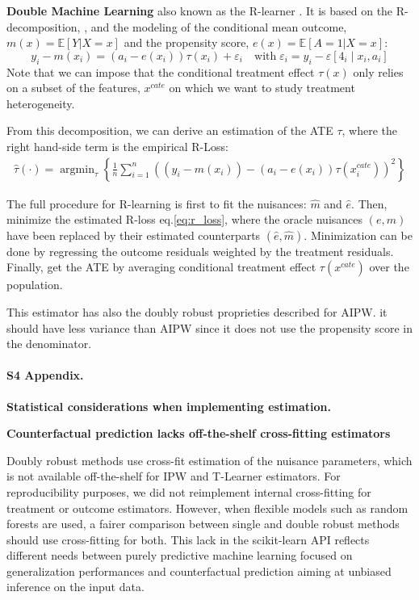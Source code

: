 \documentclass[10pt,letterpaper]{article}
\begin{document}
\textbf{Double Machine Learning} \cite{chernozhukov2018double} also known
as the R-learner \cite{nie2021quasi}. It is based on the R-decomposition,
\cite{robinson1988root}, and the modeling of the conditional mean outcome,
$m(x)=\mathbb E[Y|X=x]$ and the propensity score, $e(x)=\mathbb E[A=1|X=x]$:
\begin{equation}\label{eq:r_decomposition}
    y_{i}-m\left(x_{i}\right)=\left(a_{i}-e\left(x_{i}\right)\right) \tau\left(x_{i}\right)+\varepsilon_{i} \quad \text{with} \; \varepsilon_{i}=y_{i}-\varepsilon\left[4_{i} \mid x_{i}, a_{i}\right]
\end{equation}
Note that we can impose that the conditional treatment effect $\tau(x)$ only
relies on a subset of the features, $x^{cate}$ on which we want to study
treatment heterogeneity.

From this decomposition, we can derive an estimation of the ATE $\tau$, where
the right hand-side term is the empirical R-Loss:
\begin{align}\label{eq:r_loss}
    \hat{\tau}(\cdot)=\operatorname{argmin}_{\tau}\left\{\frac{1}{n} \sum_{i=1}^{n}\left(\left(y_{i}-m\left(x_{i}\right)\right)-\left(a_{i}-e(x_{i})\right) \tau\left(x^{cate}_{i}\right)\right)^{2}\right\}
\end{align}

The full procedure for R-learning is first to fit the nuisances: $\hat m$ and
$\hat e$. Then, minimize the estimated R-loss eq.\ref{eq:r_loss}, where
the oracle nuisances $(e, m)$ have been replaced by their estimated
counterparts $(\hat e, \hat m)$. Minimization can be done by regressing
the outcome residuals weighted by the treatment residuals. Finally, get
the ATE by averaging conditional treatment effect $\tau(x^{cate})$ over
the population.

This estimator has also the doubly robust proprieties described for AIPW. it
should have less variance than AIPW since it does not use the propensity score
in the denominator.


\paragraph*{S4 Appendix.}
\label{apd:statistical_considerations}
{\bf Statistical considerations when implementing
    estimation.}

\textbf{Counterfactual prediction lacks off-the-shelf cross-fitting estimators}

Doubly robust methods use cross-fit estimation of the nuisance parameters,
which is not available off-the-shelf for IPW and T-Learner estimators. For
reproducibility purposes, we did not reimplement internal cross-fitting for
treatment or outcome estimators. However, when flexible models such as
random forests are used, a fairer comparison between single and double
robust methods should use cross-fitting for both. This lack in the
scikit-learn API \cite{pedregosa2011scikit} reflects different needs
between purely predictive machine learning focused on generalization
performances and counterfactual prediction aiming at unbiased inference on
the input data.
\end{document}
